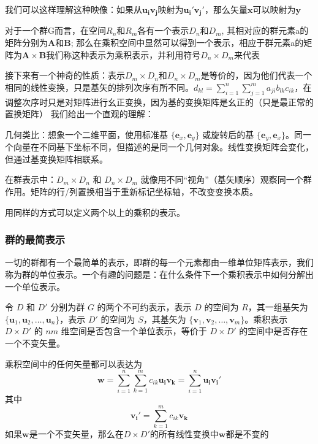 \documentclass{ctexart}%
\begin{document}
我们可以这样理解这种映像：如果从$\mathbf{u_iv_j}$映射为$\mathbf{u_i'v_j'}$，那么矢量$\mathbf{x}$可以映射为$\mathbf{y}$

对于一个群G而言，在空间$R_n$和$R_m$各有一个表示$D_n$和$D_m$, 其相对应的群元素a的矩阵分别为$\mathbf{A}$和$\mathbf{B}$; 那么在乘积空间中显然可以得到一个表示，相应于群元素a的矩阵为$\mathbf{A}\times \mathbf{B}$我们称这种表示为乘积表示，并利用符号$D_n\times D_m$来代表

接下来有一个神奇的性质：表示$D_m\times D_n$和$D_n\times D_m$是等价的，因为他们代表一个相同的线性变换，只是基矢的排列次序有所不同。$d_{kl} = \sum_{i=1}^n \sum_{j=1}^m a_{ji} b_{lk} c_{ik}$，在调整次序时只是对矩阵进行幺正变换，因为基的变换矩阵是幺正的（只是最正常的置换矩阵）
我们给出一个直观的理解：

几何类比：想象一个二维平面，使用标准基 $\{\mathbf{e}_x, \mathbf{e}_y\}$ 或旋转后的基 $\{\mathbf{e}_y, \mathbf{e}_x\}$。同一个向量在不同基下坐标不同，但描述的是同一个几何对象。线性变换矩阵会变化，但通过基变换矩阵相联系。

在群表示中：$D_m \times D_n$ 和 $D_n \times D_m$ 就像用不同“视角”（基矢顺序）观察同一个群作用。矩阵的行/列置换相当于重新标记坐标轴，不改变变换本质。

用同样的方式可以定义两个以上的乘积的表示。

\subsubsection{群的最简表示}
一切的群都有一个最简单的表示，即群的每一个元素都由一维单位矩阵表示，我们称为群的单位表示。一个有趣的问题是：在什么条件下一个乘积表示中如何分解出一个单位表示。

令 $D$ 和 $D'$ 分别为群 $G$ 的两个不可约表示，表示 $D$ 的空间为 $R$，其一组基矢为 $\{\mathbf{u}_1, \mathbf{u}_2, \ldots, \mathbf{u}_n\}$，表示 $D'$ 的空间为 $S$，其基矢为 $\{\mathbf{v}_1, \mathbf{v}_2, \ldots, \mathbf{v}_m\}$。乘积表示 $D \times D'$ 的 $nm$ 维空间是否包含一个单位表示，等价于 $D \times D'$ 的空间中是否存在一个不变矢量。

乘积空间中的任何矢量都可以表达为
\[
 \mathbf{w} = \sum_{i=1}^{n}\sum_{k=1}^{m}c_{ik}\mathbf{u_i}\mathbf{v_k} =\sum_{i=1}^{n}\mathbf{u_i}\mathbf{v_i'}
\]
其中 \[\mathbf{v_i'} = \sum_{k=1}^{m}c_{ik}\mathbf{v_k}\]
如果$\mathbf{w}$是一个不变矢量，那么在$D\times D'$的所有线性变换中$\mathbf{w}$都是不变的
\end{document}
